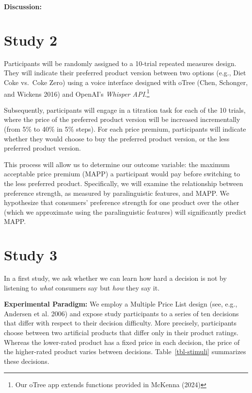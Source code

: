 \documentclass[
  a4paper,
]{scrreprt}
\begin{document}
\textbf{Discussion:}

\hypertarget{study-2}{%
\section{Study 2}\label{study-2}}

Participants will be randomly assigned to a 10-trial repeated measures
design. They will indicate their preferred product version between two
options (e.g., Diet Coke vs.~Coke Zero) using a voice interface designed
with oTree (Chen, Schonger, and Wickens 2016) and OpenAI's \emph{Whisper
API}.\footnote{Our oTree app extends functions provided in McKenna
  (2024)}

Subsequently, participants will engage in a titration task for each of
the 10 trials, where the price of the preferred product version will be
increased incrementally (from 5\% to 40\% in 5\% steps). For each price
premium, participants will indicate whether they would choose to buy the
preferred product version, or the less preferred product version.

This process will allow us to determine our outcome variable: the
maximum acceptable price premium (MAPP) a participant would pay before
switching to the less preferred product. Specifically, we will examine
the relationship between preference strength, as measured by
paralinguistic features, and MAPP. We hypothesize that consumers'
preference strength for one product over the other (which we approximate
using the paralinguistic features) will significantly predict MAPP.

\hypertarget{study-3}{%
\section{Study 3}\label{study-3}}

In a first study, we ask whether we can learn how hard a decision is not
by listening to \emph{what} consumers say but \emph{how} they say it.

\textbf{Experimental Paradigm:} We employ a Multiple Price List design
(see, e.g., Andersen et al. 2006) and expose study participants to a
series of ten decisions that differ with respect to their decision
difficulty. More precisely, participants choose between two artificial
products that differ only in their product ratings. Whereas the
lower-rated product has a fixed price in each decision, the price of the
higher-rated product varies between decisions. Table~\ref{tbl-stimuli}
summarizes these decisions.
\end{document}
